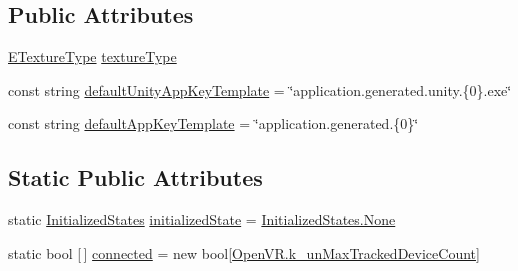 \subsection*{Public Attributes}
\begin{DoxyCompactItemize}
\item 
\mbox{\hyperlink{namespace_valve_1_1_v_r_a9481de640e411eef49c2f3fdca82eaa3}{E\+Texture\+Type}} \mbox{\hyperlink{class_valve_1_1_v_r_1_1_steam_v_r_ab18af3cf2ec5ed39ceee8901c9df6f1f}{texture\+Type}}
\item 
const string \mbox{\hyperlink{class_valve_1_1_v_r_1_1_steam_v_r_ab14fecc8ada6097d491ec89532dc2edf}{default\+Unity\+App\+Key\+Template}} = \char`\"{}application.\+generated.\+unity.\{0\}.exe\char`\"{}
\item 
const string \mbox{\hyperlink{class_valve_1_1_v_r_1_1_steam_v_r_a90671d13e29563cc9e9ba27055566cd6}{default\+App\+Key\+Template}} = \char`\"{}application.\+generated.\{0\}\char`\"{}
\end{DoxyCompactItemize}
\subsection*{Static Public Attributes}
\begin{DoxyCompactItemize}
\item 
static \mbox{\hyperlink{class_valve_1_1_v_r_1_1_steam_v_r_a09db867d75bbc654801bb318dd85a5e3}{Initialized\+States}} \mbox{\hyperlink{class_valve_1_1_v_r_1_1_steam_v_r_aebdf879d97763960970090cfff20a8a7}{initialized\+State}} = \mbox{\hyperlink{class_valve_1_1_v_r_1_1_steam_v_r_a09db867d75bbc654801bb318dd85a5e3a6adf97f83acf6453d4a6a4b1070f3754}{Initialized\+States.\+None}}
\item 
static bool \mbox{[}$\,$\mbox{]} \mbox{\hyperlink{class_valve_1_1_v_r_1_1_steam_v_r_a4e095c403f7656c9ccb476658f7b4197}{connected}} = new bool\mbox{[}\mbox{\hyperlink{class_valve_1_1_v_r_1_1_open_v_r_aec52ee031bff706f1b96c7f2c8ebc0ac}{Open\+V\+R.\+k\+\_\+un\+Max\+Tracked\+Device\+Count}}\mbox{]}
\end{DoxyCompactItemize}
